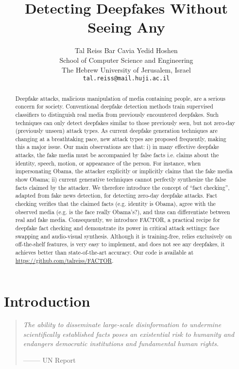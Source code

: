 \documentclass{article} \usepackage{iclr2024_conference,times}
\title{Detecting Deepfakes Without Seeing Any}
\author{Tal Reiss    Bar Cavia  Yedid Hoshen\\
School of Computer Science and Engineering\\
The Hebrew University of Jerusalem, Israel\\ 
{\tt\small tal.reiss@mail.huji.ac.il}\\
}
\begin{document}
\maketitle
\begin{abstract}    
Deepfake attacks, malicious manipulation of media containing people, are a serious concern for society. Conventional deepfake detection methods train supervised classifiers to distinguish real media from previously encountered deepfakes. Such techniques can only detect deepfakes similar to those previously seen, but not zero-day (previously unseen) attack types. As current deepfake generation techniques are changing at a breathtaking pace, new attack types are proposed frequently, making this a major issue. Our main observations are that: i) in many effective deepfake attacks, the fake media must be accompanied by false facts i.e. claims about the identity, speech, motion, or appearance of the person. For instance, when impersonating Obama, the attacker explicitly or implicitly claims that the fake media show Obama; ii) current generative techniques cannot perfectly synthesize the false facts claimed by the attacker. We therefore introduce the concept of “fact checking”, adapted from fake news detection, for detecting zero-day deepfake attacks. Fact checking verifies that the claimed facts (e.g. identity is Obama), agree with the observed media (e.g. is the face really Obama’s?), and thus can differentiate between real and fake media. Consequently, we introduce FACTOR, a practical recipe for deepfake fact checking and demonstrate its power in critical attack settings: face swapping and audio-visual synthesis. Although it is training-free, relies exclusively on off-the-shelf features, is very easy to implement, and does not see any deepfakes, it achieves better than state-of-the-art accuracy.  Our code is available at \url{https://github.com/talreiss/FACTOR}.
\end{abstract}

\section{Introduction}
\vspace{0.5em}
\begin{quote}
\textit{The ability to disseminate large-scale disinformation to undermine
scientifically established facts poses an existential risk to humanity and
endangers democratic institutions and fundamental human rights.}
\begin{flushright}
    \small{-------- UN Report}
  \end{flushright}
\end{quote}
\end{document}

